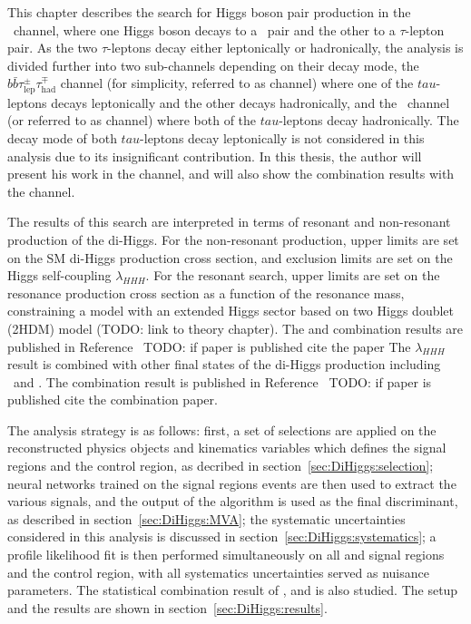 This chapter describes the search for Higgs boson pair production in the
\bbtt\ channel, where one Higgs boson decays to a \bquark\ pair 
and the other to a $\tau$-lepton pair. 
As the two $\tau$-leptons decay either leptonically or hadronically, 
the analysis is divided further into two sub-channels depending on
their decay mode, 
the $b\bar{b}\tau_{\text{lep}}^{\pm}\tau_{\text{had}}^{\mp}$ channel 
(for simplicity, referred to as \lephad channel)
where one of the $tau$-leptons decays leptonically and the other decays
hadronically, 
and the \bbtthh\ channel (or referred to as \hadhad channel) 
where both of the $tau$-leptons decay hadronically. 
The decay mode of both $tau$-leptons decay
leptonically is not considered in this analysis 
due to its insignificant contribution. 
In this thesis, the author will present his work 
in the \lephad channel, and will also show the combination results with 
the \hadhad channel.


The results of this search are interpreted in terms of resonant and 
non-resonant production of the di-Higgs.
For the non-resonant production, upper limits are set on the SM di-Higgs production
cross section, and exclusion limits are set on the Higgs self-coupling $\lambda_{HHH}$.
For the resonant search, upper limits are set on the resonance production cross section 
as a function of the resonance mass, 
constraining a model with an extended Higgs sector based on two Higgs doublet (2HDM) model
(TODO: link to theory chapter).
The \lephad and \hadhad
combination results are published in Reference~\cite{dihiggs-conf} 
TODO: if paper is published cite the paper
The $\lambda_{HHH}$ result is combined with other final states of the di-Higgs production
including \bbbb\ and \bbyy. 
The combination result is published in Reference~\cite{ATLAS-CONF-2021-052} TODO: if paper is published cite the combination paper. 

The analysis strategy is as follows:
first, a set of selections are applied on 
the reconstructed physics objects and kinematics variables which
defines the signal regions and the control region, 
as decribed in section~\ref{sec:DiHiggs:selection};
neural networks trained on the signal regions events are then 
used to extract the various signals, and the output of the algorithm is used
as the final discriminant, as described in section~\ref{sec:DiHiggs:MVA};
the systematic uncertainties considered in this analysis is discussed in 
section~\ref{sec:DiHiggs:systematics};
a profile likelihood fit is then performed simultaneously on all \lephad and \hadhad
signal regions and the control region, with all systematics uncertainties served as nuisance parameters.
The statistical combination result of \bbtt, \bbyy and \bbbb is also studied. 
The setup and the results are shown in section~\ref{sec:DiHiggs:results}.


